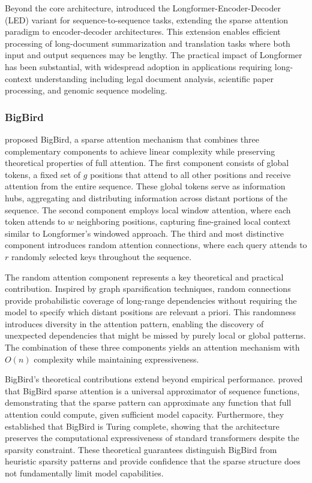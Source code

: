 Beyond the core architecture, \citet{beltagy2020longformer} introduced the Longformer-Encoder-Decoder (LED) variant for sequence-to-sequence tasks, extending the sparse attention paradigm to encoder-decoder architectures. This extension enables efficient processing of long-document summarization and translation tasks where both input and output sequences may be lengthy. The practical impact of Longformer has been substantial, with widespread adoption in applications requiring long-context understanding including legal document analysis, scientific paper processing, and genomic sequence modeling.

\subsubsection{BigBird}

\citet{zaheer2020bigbird} proposed BigBird, a sparse attention mechanism that combines three complementary components to achieve linear complexity while preserving theoretical properties of full attention. The first component consists of global tokens, a fixed set of $g$ positions that attend to all other positions and receive attention from the entire sequence. These global tokens serve as information hubs, aggregating and distributing information across distant portions of the sequence. The second component employs local window attention, where each token attends to $w$ neighboring positions, capturing fine-grained local context similar to Longformer's windowed approach. The third and most distinctive component introduces random attention connections, where each query attends to $r$ randomly selected keys throughout the sequence.

The random attention component represents a key theoretical and practical contribution. Inspired by graph sparsification techniques, random connections provide probabilistic coverage of long-range dependencies without requiring the model to specify which distant positions are relevant a priori. This randomness introduces diversity in the attention pattern, enabling the discovery of unexpected dependencies that might be missed by purely local or global patterns. The combination of these three components yields an attention mechanism with $O(n)$ complexity while maintaining expressiveness.

BigBird's theoretical contributions extend beyond empirical performance. \citet{zaheer2020bigbird} proved that BigBird sparse attention is a universal approximator of sequence functions, demonstrating that the sparse pattern can approximate any function that full attention could compute, given sufficient model capacity. Furthermore, they established that BigBird is Turing complete, showing that the architecture preserves the computational expressiveness of standard transformers despite the sparsity constraint. These theoretical guarantees distinguish BigBird from heuristic sparsity patterns and provide confidence that the sparse structure does not fundamentally limit model capabilities.

